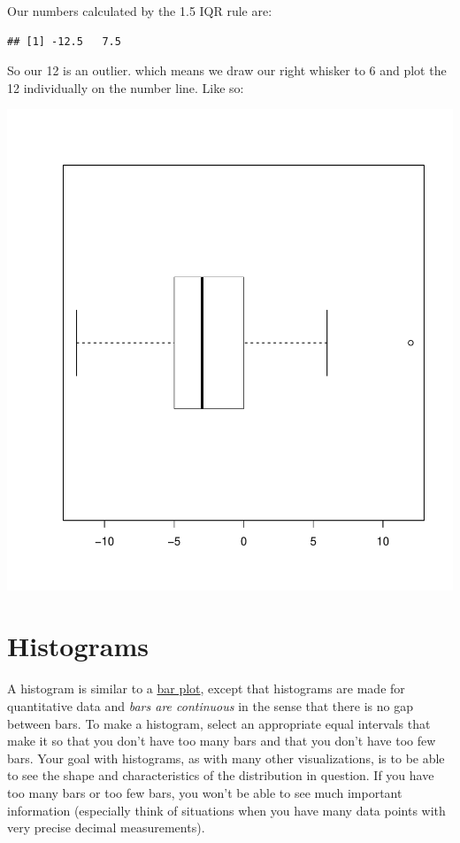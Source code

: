 \documentclass[
]{book}
\begin{document}
Our numbers calculated by the 1.5 IQR rule are:

\begin{verbatim}
## [1] -12.5   7.5
\end{verbatim}

So our 12 is an outlier. which means we draw our right whisker to 6 and
plot the 12 individually on the number line. Like so:

\includegraphics{_main_files/figure-latex/unnamed-chunk-26-1.pdf}

\hypertarget{histograms}{%
\section{Histograms}\label{histograms}}

A histogram is similar to a \protect\hyperlink{bar-plots}{bar plot}, except that
histograms are made for quantitative data and \emph{bars are continuous} in
the sense that there is no gap between bars. To make a histogram, select
an appropriate equal intervals that make it so that you don't have too
many bars and that you don't have too few bars. Your goal with
histograms, as with many other visualizations, is to be able to see the
shape and characteristics of the distribution in question. If you have
too many bars or too few bars, you won't be able to see much important
information (especially think of situations when you have many data
points with very precise decimal measurements).
\end{document}
